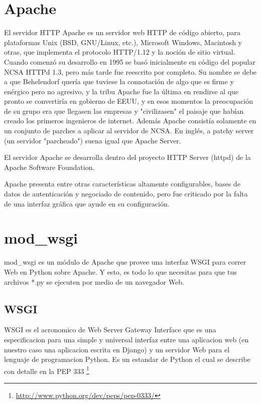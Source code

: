 \section{Apache}

El servidor HTTP Apache es un servidor web HTTP de código abierto, para plataformas
Unix (BSD, GNU/Linux, etc.), Microsoft Windows, Macintosh y otras, que implementa
el protocolo HTTP/1.12 y la noción de sitio virtual. Cuando comenzó su desarrollo en 1995 se basó inicialmente
en código del popular NCSA HTTPd 1.3, pero más tarde fue reescrito por completo. Su nombre se
debe a que Behelendorf quería que tuviese la connotación de algo que es firme
y enérgico pero no agresivo, y la tribu Apache fue la última en rendirse al que pronto se
convertiría en gobierno de EEUU, y en esos momentos la preocupación de su grupo era que
llegasen las empresas y "civilizasen" el paisaje que habían creado los primeros ingenieros de internet.
Además Apache consistía solamente en un conjunto de parches a aplicar al servidor de NCSA.
En inglés, a patchy server (un servidor "parcheado") suena igual que Apache Server. 

El servidor Apache se desarrolla dentro del proyecto HTTP Server (httpd) de la
Apache Software Foundation.

Apache presenta entre otras características altamente configurables, bases de
datos de autenticación y negociado de contenido, pero fue criticado por la falta
de una interfaz gráfica que ayude en su configuración.\\[0.2cm]

\section{mod\_wsgi}

mod\_wsgi es un módulo de Apache que provee una interfaz WSGI para correr
 Web en Python sobre Apache. Y esto, es todo lo que necesitas para que tus
 archivos *.py se ejecuten por medio de un navegador Web.

\subsection{WSGI}

WSGI es el acronomico de Web Server Gateway Interface que es una especificacion
para una simple y universal interfaz entre una aplicacion web (en nuestro caso
una aplicacion escrita en Django) y un servidor Web para el lenguaje de programacion
Python. Es un estandar de Python el cual se describe con detalle en la PEP 333
\footnote{\url{http://www.python.org/dev/peps/pep-0333/}}




